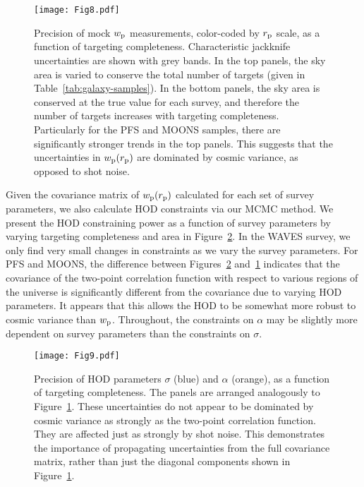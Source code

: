 \documentclass[twocolumn,twocolappendix]{aastex63}
\begin{document}
\begin{figure*}[ht!]
\texttt{[image: Fig8.pdf]}
\caption{Precision of mock $w_{\rm p}$ measurements, color-coded by $r_{\rm p}$ scale, as a function of {targeting} completeness. Characteristic jackknife uncertainties are shown with grey bands. In the top panels, the sky area is varied to conserve the total number of targets (given in Table~\ref{tab:galaxy-samples}). In the bottom panels, the sky area is conserved at the true value for each survey, and therefore the number of targets increases with {targeting} completeness. Particularly for the PFS and MOONS samples, there are significantly stronger trends in the top panels. This suggests that the uncertainties in $w_{\rm p}(r_{\rm p})$ are dominated by cosmic variance, as opposed to shot noise.
\label{fig:survey-wp-err}}
\end{figure*}


Given the covariance matrix of $w_{\rm p}(r_{\rm p})$ calculated for each set of survey parameters, we also calculate HOD constraints via our MCMC method. We present the HOD constraining power as a function of survey parameters by varying {targeting} completeness and area in Figure~\ref{fig:survey-hod-err}.
In the WAVES survey, we only find very small changes in constraints as we vary the survey parameters.
For PFS and MOONS, the difference between Figures~\ref{fig:survey-hod-err} and~\ref{fig:survey-wp-err} indicates that the covariance of the two-point correlation function with respect to various regions of the universe is significantly different from the covariance due to varying HOD parameters. It appears that this allows the HOD to be somewhat more robust to cosmic variance than $w_{\rm p}$. Throughout, the constraints on $\alpha$ may be slightly more dependent on survey parameters than the constraints on $\sigma$. 



\begin{figure*}[ht!]
\texttt{[image: Fig9.pdf]}
\caption{Precision of HOD parameters $\sigma$ (blue) and $\alpha$ (orange), as a function of {targeting} completeness. The panels are arranged analogously to Figure~\ref{fig:survey-wp-err}. These uncertainties do not appear to be dominated by cosmic variance as strongly as the two-point correlation function. They are affected just as strongly by shot noise. This demonstrates the importance of propagating uncertainties from the full covariance matrix, rather than just the diagonal components shown in Figure~\ref{fig:survey-wp-err}.
\label{fig:survey-hod-err}}
\end{figure*}
\end{document}
